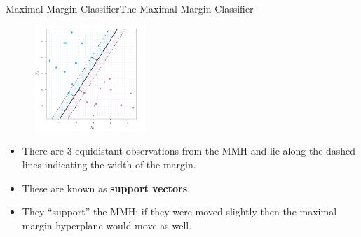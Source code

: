 \begin{frame}{Maximal Margin Classifier}{The Maximal Margin Classifier}

\begin{figure}
    \centering
    \includegraphics[height=4cm]{mmc/maximal-margin-hyperplane.png}
\end{figure}

\begin{itemize}
    \item There are 3 equidistant observations from the MMH and lie along the dashed lines indicating the width of the margin.  \pause 
    \item These are known as \textbf{support vectors}.   \pause 
    \item They “support” the MMH: if they were moved slightly then the maximal margin hyperplane would move as well.
\end{itemize}
    
\end{frame}

